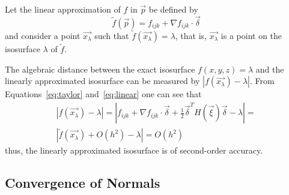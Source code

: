 Let the linear approximation of $f$ in $\vec{p}$ be defined by
\begin{equation}
\tilde{f}(\vec{p}) = f_{ijk} + \nabla f_{ijk}\cdot \vec{\delta}
\label{eq:linear}
\end{equation}
\noindent and consider a point $\vec{x_\lambda}$  such that $\tilde{f}(\vec{x_\lambda}) = \lambda$, that is,  
$\vec{x_\lambda}$ is a point on the isosurface $\lambda$ of $\tilde{f}$.

The algebraic distance between the exact isosurface $f(x,y,z) = \lambda$ and
the linearly approximated isosurface can be measured by 
$|f(\vec{x_\lambda}) - \lambda|$. From Equations~\ref{eq:taylor} and~\ref{eq:linear} one can 
see that
\begin{equation}
\begin{array}{c}
\displaystyle{|f(\vec{x_\lambda}) - \lambda| = |f_{ijk} + \nabla f_{ijk}\cdot \vec{\delta} + \frac{1}{2}\vec{\delta}^T H(\vec{\xi}) \vec{\delta} -\lambda| =}\\
|\tilde{f}(\vec{x_\lambda}) + O(h^2) -\lambda| = O(h^2)
\end{array}
\label{eq:algebraicerror}
\end{equation}
\noindent thus, the linearly approximated isosurface is of second-order accuracy.




\subsection{Convergence of Normals}
\label{chap1:sec:normalconvergence}

